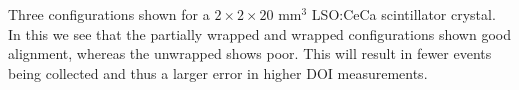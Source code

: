 \label{fig:confinement-20} Three configurations shown for a $2\times2\times20$ mm$^3$ LSO:CeCa scintillator crystal. In this we see that the partially wrapped and wrapped configurations shown good alignment, whereas the unwrapped shows poor. This will result in fewer events being collected and thus a larger error in higher DOI measurements.